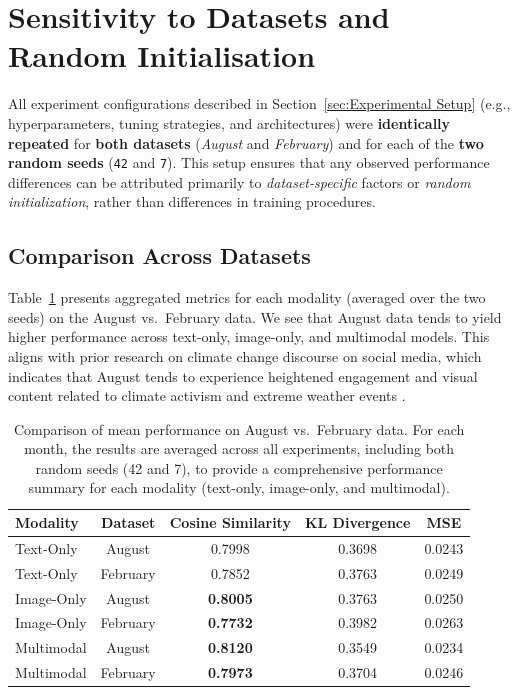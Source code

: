 \section{Sensitivity to Datasets and Random Initialisation}
\label{sec:dataset_seed_variations}

All experiment configurations described in Section~\ref{sec:Experimental Setup} (e.g., hyperparameters, tuning strategies, and architectures) were \textbf{identically repeated} for \textbf{both datasets} (\textit{August} and \textit{February}) and for each of the \textbf{two random seeds} (\texttt{42} and \texttt{7}). 
This setup ensures that any observed performance differences can be attributed primarily to \emph{dataset-specific} factors or \emph{random initialization}, rather than differences in training procedures.

\subsection{Comparison Across Datasets}
\label{subsec:results_datasets}
Table~\ref{tab:dataset_comparison} presents aggregated metrics for each modality (averaged over the two seeds) on the August vs.\ February data. We see that August data tends to yield higher performance across text-only, image-only, and multimodal models. This aligns with prior research on climate change discourse on social media, which indicates that August tends to experience heightened engagement and visual content related to climate activism and extreme weather events \cite{mooseder_social_2023}.

\begin{table}[ht]
    \centering
    \begin{tabular}{lcccc}
    \toprule
    \textbf{Modality} & \textbf{Dataset} & \textbf{Cosine Similarity} & \textbf{KL Divergence} & \textbf{MSE} \\
    \midrule
    Text-Only & August & 0.7998 &  0.3698 & 0.0243 \\
    Text-Only & February & 0.7852 &  0.3763 & 0.0249 \\
    \midrule
    Image-Only & August & \textbf{0.8005} & 0.3763 & 0.0250 \\
    Image-Only & February & \textbf{0.7732} & 0.3982 & 0.0263 \\
    \midrule
    Multimodal & August & \textbf{0.8120} & 0.3549 & 0.0234 \\
    Multimodal & February & \textbf{0.7973} & 0.3704 & 0.0246 \\
    \bottomrule
    \end{tabular}%
    \caption{Comparison of mean performance on August vs.\ February data. 
    For each month, the results are averaged across all experiments, including both random seeds (42 and 7), to provide a comprehensive performance summary for each modality (text-only, image-only, and multimodal).}

    \label{tab:dataset_comparison}
\end{table}

